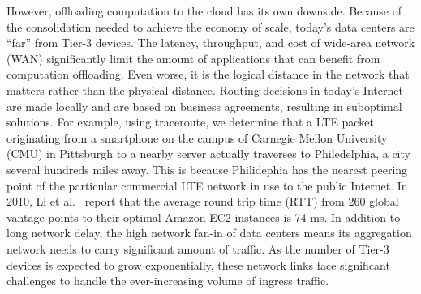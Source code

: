 However, offloading computation to the cloud has its own downside. Because of
the consolidation needed to achieve the economy of scale, today's data centers
are ``far'' from Tier-3 devices. The latency, throughput, and cost of wide-area
network (WAN) significantly limit the amount of applications that can benefit
from computation offloading. Even worse, it is the logical distance in the
network that matters rather than the physical distance. Routing decisions in
today's Internet are made locally and are based on business agreements,
resulting in suboptimal solutions. For example, using traceroute, we determine
that a LTE packet originating from a smartphone on the campus of Carnegie Mellon
University (CMU) in Pittsburgh to a nearby server actually traverses to
Philedelphia, a city several hundreds miles away. This is because Philidephia
has the nearest peering point of the particular commercial LTE network in use to
the public Internet. In 2010, Li et al.~\cite{li2010cloudcmp} report that the
average round trip time (RTT) from 260 global vantage points to their optimal
Amazon EC2 instances is 74 ms. In addition to long network delay, the high
network fan-in of data centers means its aggregation network needs to carry
significant amount of traffic. As the number of Tier-3 devices is expected to
grow exponentially, these network links face significant challenges to handle
the ever-increasing volume of ingress traffic.

